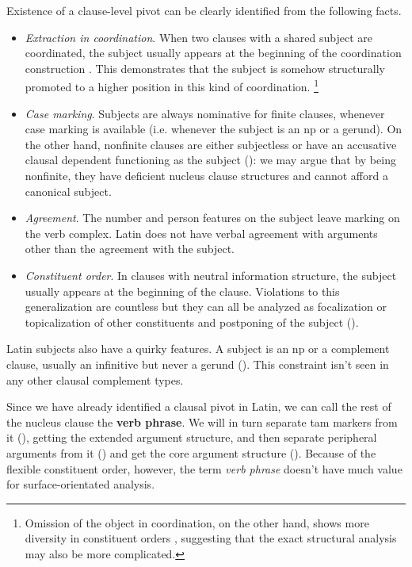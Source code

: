 \documentclass[a4paper, oneside, 12pt]{report}
\newcommand*{\citesec}[1]{\S~{#1}}
\newcommand*{\concept}[1]{\textbf{#1}}
\newcommand*{\term}[1]{\emph{#1}}
\begin{document}
Existence of a clause-level pivot can be clearly identified from the following facts.
\begin{itemize}
    \item \emph{Extraction in coordination}. 
    When two clauses with a shared subject are coordinated,
    the subject usually appears at the beginning of the coordination construction 
    \citep[\citesec{19.5}]{pinkster2}.
    This demonstrates that the subject is somehow structurally 
    promoted to a higher position in this kind of coordination.%
    \footnote{
        Omission of the object in coordination, on the other hand,
        shows more diversity in constituent orders \citep[\citesec{19.6}]{pinkster2},
        suggesting that the exact structural analysis may also be more complicated.
    }

    \item \emph{Case marking}.
    Subjects are always nominative for finite clauses,
    whenever case marking is available
    (i.e. whenever the subject is an \ac{np} or a gerund). 
    On the other hand, 
    nonfinite clauses are either subjectless  
    or have an accusative clausal dependent functioning as the subject
    ():
    we may argue that by being nonfinite,
    they have deficient nucleus clause structures 
    and cannot afford a canonical subject.

    \item \emph{Agreement}.
    The number and person features on the subject leave marking on the verb complex.
    Latin does not have verbal agreement with arguments other than the agreement with the subject.
    
    \item \emph{Constituent order}. In clauses with neutral information structure,
    the subject usually appears at the beginning of the clause.
    Violations to this generalization are countless 
    but they can all be analyzed as focalization or topicalization of other constituents 
    and postponing of the subject (). 
\end{itemize}

Latin subjects also have a quirky features.
A subject is an \ac{np}  
or a complement clause, 
usually an infinitive but never a gerund ().
This constraint isn't seen in any other clausal complement types.

Since we have already identified a clausal pivot in Latin,
we can call the rest of the nucleus clause the \concept{verb phrase}.
We will in turn separate \ac{tam} markers from it (),
getting the extended argument structure,
and then separate peripheral arguments from it ()
and get the core argument structure ().
Because of the flexible constituent order, however,
the term \term{verb phrase} doesn't have much value for surface-orientated analysis.
\end{document}
